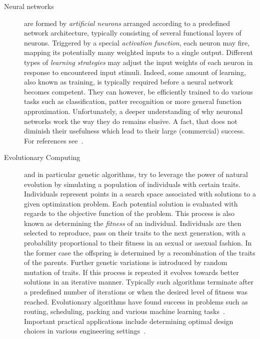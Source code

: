 		\begin{description}
			
			\item[Neural networks] are formed by \emph{artificial neurons} arranged according to a predefined network architecture, typically consisting of several functional layers of neurons. Triggered by a special \emph{activation function}, each neuron may fire, \ie mapping its potentially many weighted inputs to a single output. Different types of \emph{learning strategies} may adjust the input weights of each neuron in response to encountered input stimuli. Indeed, some amount of learning, also known as training, is typically required before a neural network becomes competent. They can however, be efficiently trained to do various tasks such as classification, patter recognition or more general function approximation. Unfortunately, a deeper understanding of why neuronal networks work the way they do remains elusive. A fact, that does not diminish their usefulness which lead to their large (commercial) success. For references see~\cite{Haykin:1998:NNC:521706,Fausett:1994:FNN:197023,Bishop:1995:NNP:525960}.

			\item[Evolutionary Computing] and in particular genetic algorithms, try to leverage the power of natural evolution by simulating a population of individuals with certain traits. Individuals represent points in a search space associated with solutions to a given optimization problem. Each potential solution is evaluated with regards to the objective function of the problem. This process is also known as determining the \emph{fitness} of an individual. Individuals are then selected to reproduce, \ie pass on their traits to the next generation, with a probability proportional to their fitness in an sexual or asexual fashion. In the former case the offspring is determined by a recombination of the traits of the parents. Further genetic variations is introduced by random mutation of traits. If this process is repeated it evolves towards better solutions in an iterative manner. Typically such algorithms terminate after a predefined number of iterations or when the desired level of fitness was reached. Evolutionary algorithms have found success in problems such as routing, scheduling, packing and various machine learning tasks~\cite{Back:1997:HEC:548530,spears1993overview,zitzler2000comparison}. Important practical applications include determining optimal design choices in various engineering settings~\cite{Schwefel:1993:EOS:529401,kicinger2005evolutionary}.


\end{description}
